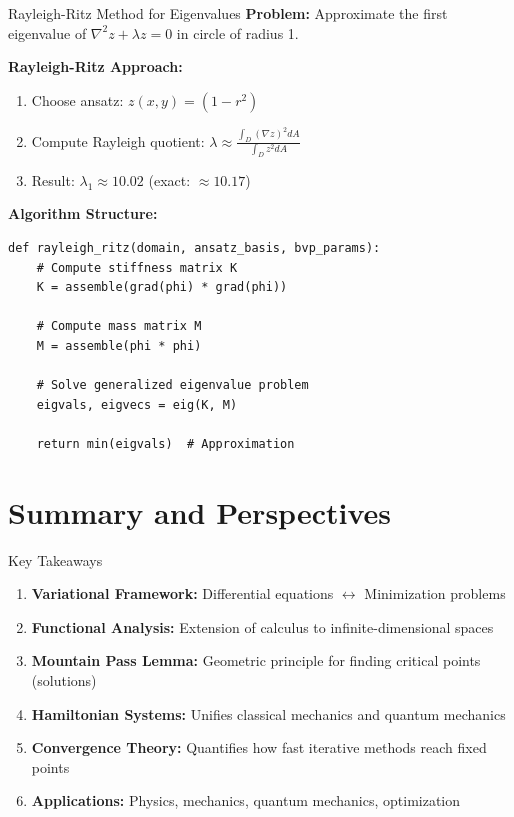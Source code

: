 \documentclass[aspectratio=169,10pt]{beamer}
\begin{document}
\begin{frame}[fragile]{Rayleigh-Ritz Method for Eigenvalues}
  \textbf{Problem:} Approximate the first eigenvalue of $\nabla^2 z + \lambda z = 0$ in circle of radius 1.

  \vspace{0.3cm}
  \textbf{Rayleigh-Ritz Approach:}
  \begin{enumerate}
    \item Choose ansatz: $z(x,y) = (1 - r^2)$
    \item Compute Rayleigh quotient: $\lambda \approx \frac{\int_D (\nabla z)^2 dA}{\int_D z^2 dA}$
    \item Result: $\lambda_1 \approx 10.02$ (exact: $\approx 10.17$)
  \end{enumerate}

  \vspace{0.3cm}
  \textbf{Algorithm Structure:}
  \begin{lstlisting}
def rayleigh_ritz(domain, ansatz_basis, bvp_params):
    # Compute stiffness matrix K
    K = assemble(grad(phi) * grad(phi))

    # Compute mass matrix M
    M = assemble(phi * phi)

    # Solve generalized eigenvalue problem
    eigvals, eigvecs = eig(K, M)

    return min(eigvals)  # Approximation
  \end{lstlisting}
\end{frame}

\section{Summary and Perspectives}

\begin{frame}{Key Takeaways}
  \begin{enumerate}
    \item \textbf{Variational Framework:} Differential equations $\leftrightarrow$ Minimization problems

    \item \textbf{Functional Analysis:} Extension of calculus to infinite-dimensional spaces

    \item \textbf{Mountain Pass Lemma:} Geometric principle for finding critical points (solutions)

    \item \textbf{Hamiltonian Systems:} Unifies classical mechanics and quantum mechanics

    \item \textbf{Convergence Theory:} Quantifies how fast iterative methods reach fixed points

    \item \textbf{Applications:} Physics, mechanics, quantum mechanics, optimization
  \end{enumerate}
\end{frame}
\end{document}
